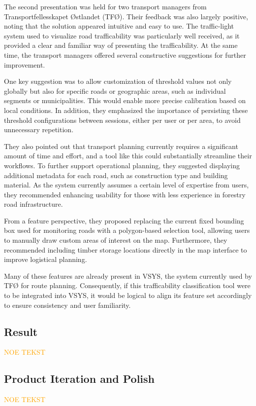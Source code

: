 The second presentation was held for two transport managers from Transportfellesskapet Østlandet (TFØ). Their feedback was also largely positive, noting that the solution appeared intuitive and easy to use. The traffic-light system used to visualize road trafficability was particularly well received, as it provided a clear and familiar way of presenting the trafficability. At the same time, the transport managers offered several constructive suggestions for further improvement.

One key suggestion was to allow customization of threshold values not only globally but also for specific roads or geographic areas, such as individual segments or municipalities. This would enable more precise calibration based on local conditions. In addition, they emphasized the importance of persisting these threshold configurations between sessions, either per user or per area, to avoid unnecessary repetition.

They also pointed out that transport planning currently requires a significant amount of time and effort, and a tool like this could substantially streamline their workflows. To further support operational planning, they suggested displaying additional metadata for each road, such as construction type and building material. As the system currently assumes a certain level of expertise from users, they recommended enhancing usability for those with less experience in forestry road infrastructure.

From a feature perspective, they proposed replacing the current fixed bounding box used for monitoring roads with a polygon-based selection tool, allowing users to manually draw custom areas of interest on the map. Furthermore, they recommended including timber storage locations directly in the map interface to improve logistical planning.

Many of these features are already present in VSYS, the system currently used by TFØ for route planning. Consequently, if this trafficability classification tool were to be integrated into VSYS, it would be logical to align its feature set accordingly to ensure consistency and user familiarity.

\subsection{Result}

\textcolor{orange}{NOE TEKST}

\subsection{Product Iteration and Polish}

\textcolor{orange}{NOE TEKST}
